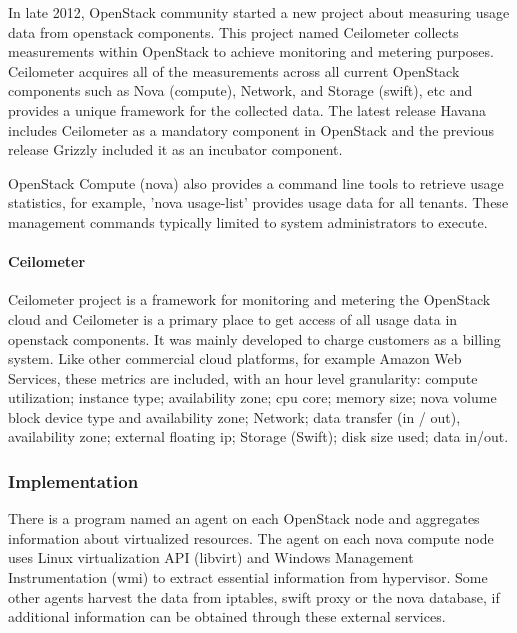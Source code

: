 \documentclass{sig-alternate-05-2015}
\newcommand{\task}[1]{\smallskip\todo[inline, color=gray!20]{#1}}
\begin{document}
In late 2012, OpenStack community started a new project about measuring usage data from openstack components. This project named Ceilometer collects measurements within OpenStack to achieve monitoring and metering purposes. Ceilometer acquires all of the measurements across all current OpenStack components such as Nova (compute), Network, and Storage (swift), etc and provides a unique framework for the collected data. The latest release Havana includes Ceilometer as a mandatory component in OpenStack and the previous release Grizzly included it as an incubator component.

OpenStack Compute (nova) also provides a command line tools to retrieve usage statistics, for example, 'nova usage-list' provides usage data for all tenants. These management commands typically limited to system administrators to execute.

\paragraph{Ceilometer}

Ceilometer project is a framework for monitoring and metering the OpenStack cloud and Ceilometer is a primary place to get access of all usage data in openstack components. It was mainly developed to charge customers as a billing system. Like other commercial cloud platforms, for example Amazon Web Services, these metrics are included, with an hour level granularity:
  compute utilization;
   instance type;
   availability zone;
   cpu core;
   memory size;
   nova volume block device type and availability zone;
   Network;
   data transfer (in / out), availability zone;
   external floating ip;
   Storage (Swift);
   disk size used;
   data in/out.

\subsubsection{Implementation}

\task{Wrong section heading}

There is a program named an agent on each OpenStack node and aggregates information about virtualized resources. The agent on each nova compute node uses Linux virtualization API (libvirt) and Windows Management Instrumentation (wmi) to extract essential information from hypervisor. Some other agents harvest the data from iptables, swift proxy or the nova database, if additional information can be obtained through these external services.
\end{document}
